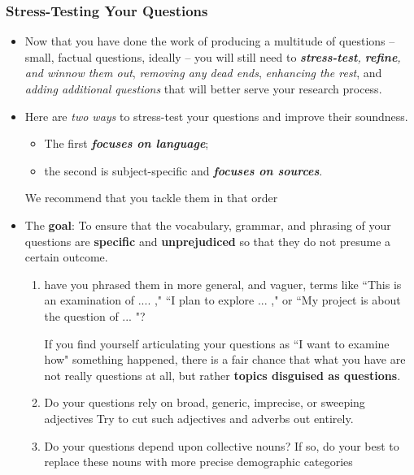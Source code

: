 \documentclass[11pt]{article}
\begin{document}
\subsubsection{Stress-Testing Your Questions}
\begin{itemize}
\item Now that you have done the work of producing a multitude of questions --  small, factual questions, ideally -- you will still need to \emph{\textbf{stress-test}, \textbf{refine}, and winnow them out}, \emph{removing any dead ends}, \emph{enhancing the rest}, and \emph{adding additional questions} that will better serve your research process.

\item Here are \emph{two ways} to stress-test your questions and improve their soundness. 
\begin{itemize}
\item The first \emph{\textbf{focuses on language}}; 

\item the second is subject-specific and \emph{\textbf{focuses on sources}}.
\end{itemize} We recommend that you tackle them in that order

\item \begin{exercise}

The \textbf{goal}: To ensure that the vocabulary, grammar, and phrasing of your questions are \textbf{specific} and \textbf{unprejudiced} so that they do not presume a certain outcome.
\begin{enumerate}
\item have you phrased them in more general, and vaguer, terms like 
``This is an examination of .... ,"
``I plan to explore ... ," or 
``My project is about the question of ... "? 

 If you find yourself articulating your questions as ``I want to examine how" something happened, there is a fair chance that what you have are not really questions at all, but rather \textbf{topics disguised as questions}. 

 \item Do your questions rely on broad, generic, imprecise, or sweeping adjectives Try to cut such adjectives and adverbs out entirely.
 
\item Do your questions depend upon collective nouns? If so, do your best to replace these nouns with more precise demographic categories
 

\end{enumerate}
\end{exercise}
\end{itemize}
\end{document}
